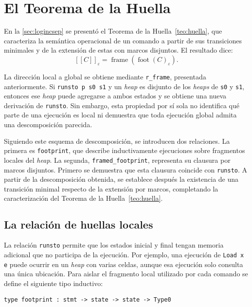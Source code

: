 \documentclass[a4paper,	11pt]{report}
\newif\ifdraft\drafttrue
\newcommand{\comm}[3]{\ifdraft{{\color{#1}[#2: #3]}}\fi}
\newcommand{\guido}[1]{\comm{blue}{Guido}{#1}}
\begin{document}
\section{El Teorema de la Huella}
\label{sec:isl-huella}
En la \autoref{sec:logincsep} se presentó el Teorema de la Huella~\ref{teo:huella},
que caracteriza la semántica operacional de un comando a partir de sus transiciones minimales y de la extensión de estas con marcos disjuntos.
El resultado dice:
$$[\![C]\!]_\varepsilon = \operatorname{frame}(\operatorname{foot}(C)_\varepsilon).$$

La dirección local a global se obtiene mediante \lstinline|r_frame|,
presentada anteriormente.
Si \lstinline|runsto p s0 s1| y un \emph{heap} es disjunto de los \emph{heaps} de \lstinline|s0| y \lstinline|s1|,
entonces ese \emph{heap} puede agregarse a ambos estados y se obtiene una nueva derivación de \lstinline|runsto|.
Sin embargo,
esta propiedad por sí sola no identifica qué parte de una ejecución es local ni demuestra que toda ejecución global admita una descomposición parecida.

Siguiendo este esquema de descomposición,
se introducen dos relaciones.
La primera es \lstinline|footprint|,
que describe inductivamente ejecuciones sobre fragmentos locales del \emph{heap}.
La segunda,
\lstinline|framed_footprint|,
representa su clausura por marcos disjuntos.
Primero se demuestra que esta clausura coincide con \lstinline|runsto|.
A partir de la descomposición obtenida,
se establece después la existencia de una transición minimal respecto de la extensión por marcos,
completando la caracterización del Teorema de la Huella~\ref{teo:huella}.

\subsection*{La relación de huellas locales}
La relación \lstinline|runsto| permite que los estados inicial y final tengan memoria adicional que no participa de la ejecución.
Por ejemplo,
una ejecución de \lstinline|Load x e| puede ocurrir en un \emph{heap} con varias celdas,
aunque esa ejecución solo consulta una única ubicación.
Para aislar el fragmento local utilizado por cada comando se define el siguiente tipo inductivo:

\begin{lstlisting}
type footprint : stmt -> state -> state -> Type0
\end{lstlisting}
\end{document}

